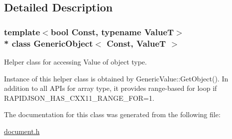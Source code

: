 \subsection{Detailed Description}
\subsubsection*{template$<$bool Const, typename ValueT$>$\\*
class Generic\+Object$<$ Const, Value\+T $>$}

Helper class for accessing Value of object type. 

Instance of this helper class is obtained by {\ttfamily Generic\+Value\+::\+Get\+Object()}. In addition to all A\+P\+Is for array type, it provides range-\/based for loop if {\ttfamily R\+A\+P\+I\+D\+J\+S\+O\+N\+\_\+\+H\+A\+S\+\_\+\+C\+X\+X11\+\_\+\+R\+A\+N\+G\+E\+\_\+\+F\+OR=1}. 

The documentation for this class was generated from the following file\+:\begin{DoxyCompactItemize}
\item 
\hyperlink{a00473}{document.\+h}\end{DoxyCompactItemize}
